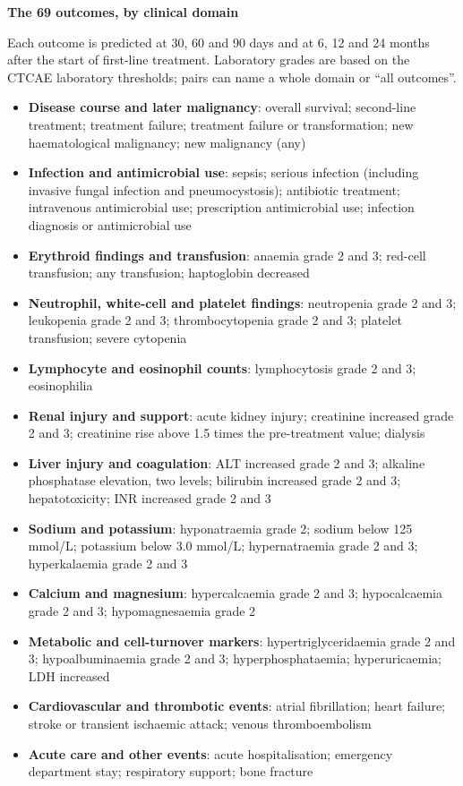 \documentclass[10pt,a4paper]{article}
\begin{document}
\begin{Form}
{\large\bfseries The 69 outcomes, by clinical domain}\par
Each outcome is predicted at 30, 60 and 90 days and at 6, 12 and 24 months after the start of
first-line treatment. Laboratory grades are based on the CTCAE laboratory thresholds; pairs can name a
whole domain or ``all outcomes''.
\begin{itemize}[leftmargin=0pt,itemsep=2pt,topsep=2pt]
\item[] \textbf{Disease course and later malignancy}: overall survival; second-line treatment; treatment failure; treatment failure or transformation; new haematological malignancy; new malignancy (any)
\item[] \textbf{Infection and antimicrobial use}: sepsis; serious infection (including invasive fungal infection and pneumocystosis); antibiotic treatment; intravenous antimicrobial use; prescription antimicrobial use; infection diagnosis or antimicrobial use
\item[] \textbf{Erythroid findings and transfusion}: anaemia grade 2 and 3; red-cell transfusion; any transfusion; haptoglobin decreased
\item[] \textbf{Neutrophil, white-cell and platelet findings}: neutropenia grade 2 and 3; leukopenia grade 2 and 3; thrombocytopenia grade 2 and 3; platelet transfusion; severe cytopenia
\item[] \textbf{Lymphocyte and eosinophil counts}: lymphocytosis grade 2 and 3; eosinophilia
\item[] \textbf{Renal injury and support}: acute kidney injury; creatinine increased grade 2 and 3; creatinine rise above 1.5 times the pre-treatment value; dialysis
\item[] \textbf{Liver injury and coagulation}: ALT increased grade 2 and 3; alkaline phosphatase elevation, two levels; bilirubin increased grade 2 and 3; hepatotoxicity; INR increased grade 2 and 3
\item[] \textbf{Sodium and potassium}: hyponatraemia grade 2; sodium below 125 mmol/L; potassium below 3.0 mmol/L; hypernatraemia grade 2 and 3; hyperkalaemia grade 2 and 3
\item[] \textbf{Calcium and magnesium}: hypercalcaemia grade 2 and 3; hypocalcaemia grade 2 and 3; hypomagnesaemia grade 2
\item[] \textbf{Metabolic and cell-turnover markers}: hypertriglyceridaemia grade 2 and 3; hypoalbuminaemia grade 2 and 3; hyperphosphataemia; hyperuricaemia; LDH increased
\item[] \textbf{Cardiovascular and thrombotic events}: atrial fibrillation; heart failure; stroke or transient ischaemic attack; venous thromboembolism
\item[] \textbf{Acute care and other events}: acute hospitalisation; emergency department stay; respiratory support; bone fracture
\end{itemize}
\end{Form}
\end{document}
